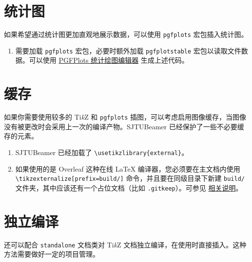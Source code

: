 \documentclass[
    UTF8,
    heading=true,
    12pt,
    a4paper
]{ctexrep}
\newenvironment{commentlist}{\begin{enumerate}\small}{\end{enumerate}}
\newcommand{\cls}[1]{\texttt{#1}}
\newcommand{\pkg}[1]{\texttt{#1}}
\def\themename{\textsf{SJTUBeamer}}
\begin{document}
\section{统计图}

如果希望通过统计图更加直观地展示数据，可以使用 \pkg{pgfplots} 宏包插入统计图。


\begin{commentlist}
  \item 需要加载 \pkg{pgfplots} 宏包，必要时额外加载 \pkg{pgfplotstable} 宏包以读取文件数据。可以使用 \href{https://logcreative.github.io/PGFPlotsEdt/}{PGFPlots 统计绘图编辑器} 生成上述代码。
\end{commentlist}

\section{缓存}

如果你需要使用较多的 Ti\emph{k}Z 和 \pkg{pgfplots} 插图，可以考虑启用图像缓存，当图像没有被更改时会采用上一次的编译产物。\themename{} 已经保护了一些不必要缓存的元素。


\begin{commentlist}
  \item \themename{} 已经加载了 \verb"\usetikzlibrary{external}"。
  \item[\faExclamationTriangle] 如果使用的是 Overleaf 这种在线 \LaTeX{} 编译器，您必须要在主文档内使用 \verb"\tikzexternalize[prefix=build/]" 命令，并且要在同级目录下新建 \verb"build/" 文件夹，其中应该还有一个占位文档（比如 \verb".gitkeep"）。可参见 \href{https://www.overleaf.com/learn/latex/Questions/I_have_a_lot_of_tikz%2C_matlab2tikz_or_pgfplots_figures%2C_so_I%27m_getting_a_compilation_timeout._Can_I_externalise_my_figures%3F}{相关说明}。
\end{commentlist}

\section{独立编译}

还可以配合 \cls{standalone} 文档类对 Ti\emph{k}Z 文档独立编译，在使用时直接插入。这种方法需要做好一定的项目管理。

\end{document}
